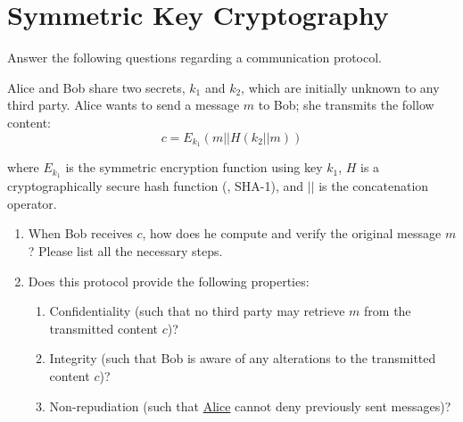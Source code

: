 \newpage
\section{Symmetric Key Cryptography}

Answer the following questions regarding a communication protocol.

Alice and Bob share two secrets, $k_1$ and $k_2$, which are initially
unknown to any third party. Alice wants to send a message $m$ to Bob;
she transmits the follow content:
$$c = E_{k_1} (m || H(k_2 || m) )$$

where $E_{k_1}$ is the symmetric encryption function using key $k_1$,
$H$ is a cryptographically secure hash function (\eg, SHA-1), and $||$ is
the concatenation operator.

\begin{enumerate}
    \item When Bob receives $c$, how does he compute and verify the original message $m$? Please list all the necessary steps.

     \item Does this protocol provide the following properties:
       \begin{enumerate}
         \item Confidentiality (such that no third party may retrieve $m$ from the transmitted content $c$)?
         \item Integrity (such that Bob is aware of any alterations to the transmitted content $c$)?
         \item Non-repudiation (such that \underline{Alice} cannot deny previously sent messages)?
         \end{enumerate}


\end{enumerate}
